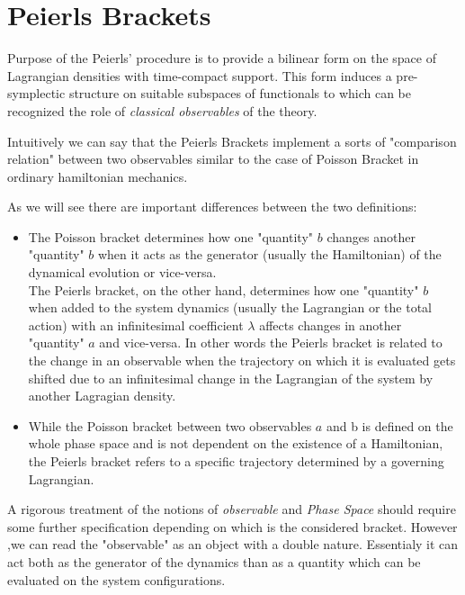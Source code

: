 \documentclass[Main]{subfiles}
\begin{document}
	\section{Peierls Brackets}
		Purpose of the Peierls' procedure is to provide a bilinear form on the space of Lagrangian densities with time-compact support.
		This form induces a pre-symplectic structure on suitable subspaces of functionals to which can be recognized the role of \emph{classical observables}  of the theory.	
	
	\begin{observation}
		Intuitively we can say that the Peierls Brackets implement a sorts of "comparison relation" between two observables similar to the case of Poisson Bracket in ordinary hamiltonian mechanics.
		
		As we will see there are important differences between the two definitions:
		\begin{itemize}
			\item The Poisson bracket determines how one "quantity" $b$ changes another "quantity" $b$ when it acts as the  generator (usually the  Hamiltonian) of the dynamical evolution or vice-versa. \cite{Sharan2010}
	\\	
	The Peierls bracket, on the other hand, determines how one "quantity" $b$  when added to the system dynamics (usually the Lagrangian or the total action)  with an infinitesimal coefficient $\lambda$ affects changes in another "quantity" $a$ and vice-versa.
	In other words the Peierls bracket is related to the change in an observable when the trajectory on which it is evaluated gets shifted due to an infinitesimal change in the Lagrangian of the system by another Lagragian density.
	
			\item While the Poisson bracket between two observables $a$ and b is defined on the whole phase space and is not dependent on the existence of a Hamiltonian, the Peierls bracket refers to a specific trajectory determined by a governing Lagrangian. 
		\end{itemize}
		A rigorous treatment of the notions of \emph{observable} and \emph{Phase Space} should require some further specification depending on which is the  considered bracket.		
		However ,we can read the "observable" as an object with a double nature. Essentialy it can act both as the generator of the dynamics than as a quantity which can be evaluated on the system configurations.
	\end{observation}	
	
\end{document}
